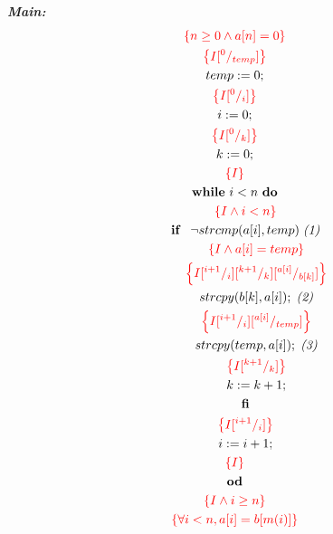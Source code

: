 \documentclass [a4paper, 12pt, fleqn]  {article}
\newcommand{\assn}[1]{{\color{red}\left\{#1\right\}}}
\begin{document}
\textit{\textbf{Main:}}
\begin {gather*}
\assn{ n \geq 0 \AND a[n] = 0   } \\
\assn{  I \subst 0 {temp}   } \\
temp \Ass 0; \\
\assn {  I \subst 0i  } \\
i \Ass 0; \\
\assn {  I \subst 0k  } \\
k \Ass 0; \\
\assn{ I } \\
\WHILE ~ i < n ~ \DO \\
\hspace{0.6cm} \assn{  I \AND i < n  } \\
\hspace{0.6cm} \IF \hspace{0.3cm} \neg strcmp(a[i], temp) \hspace{0.1cm} \textit{(1)} \\
\hspace{1.2cm} \assn{ I \AND a[i] = temp  } \\
\hspace{1.2cm} \assn {   I \subst {i + 1} i \subst {k + 1} k \subst {a[i]} {b[k]}    } \\
\hspace{1.2cm} strcpy (b[k], a[i]); \hspace{0.1cm} \textit{(2)} \\
\hspace{1.2cm} \assn{  I \subst {i + 1} i \subst {a[i]} { temp }   } \\
\hspace{1.2cm} strcpy (temp, a[i]); \hspace{0.1cm} \textit{(3)}\\
\hspace{1.2cm} \assn{  I \subst {k + 1} k } \\
\hspace{1.2cm} k \Ass k + 1; \\
\hspace{0.6cm} \FI \\
\hspace{0.6cm} \assn{  I \subst {i + 1 } i } \\
\hspace{0.6cm} i \Ass i + 1; \\
\assn{  I } \\
\OD \\
\assn {  I \AND i \geq n   } \\
\assn {  \forall i < n, a[i] = b[m(i)]  } \\
\end{gather*}
\\
\end{document}

